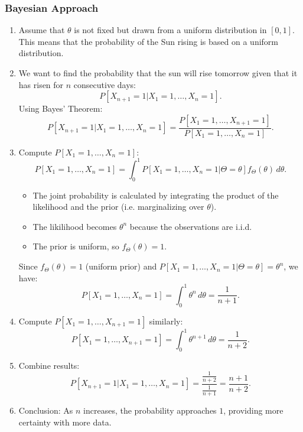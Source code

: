 \subsubsection{Bayesian Approach}
\begin{example}
    \begin{enumerate}
        \item Assume that $\theta$ is not fixed but drawn from a uniform distribution in $[0, 1]$. This means that the probability of the Sun rising is based on a uniform distribution.
        \item We want to find the probability that the sun will rise tomorrow given that it has risen for $n$ consecutive days:
        \[
        P[X_{n+1} = 1 | X_1 = 1, \dots, X_n = 1].
        \]
        Using Bayes' Theorem:
        \[
        P[X_{n+1} = 1 | X_1 = 1, \dots, X_n = 1] = \frac{P[X_1 = 1, \dots, X_{n+1} = 1]}{P[X_1 = 1, \dots, X_n = 1]}.
        \]
        \item Compute $P[X_1 = 1, \dots, X_n = 1]$:
        \[
        P[X_1 = 1, \dots, X_n = 1] = \int_0^1 P[X_1 = 1, \dots, X_n = 1 | \Theta = \theta] f_\Theta(\theta) \, d\theta.
        \]
        \begin{itemize}
            \item The joint probability is calculated by integrating the product of the likelihood and the prior (i.e. marginalizing over $\theta$).
            \item The likilihood becomes $\theta^n$ because the observations are i.i.d.
            \item The prior is uniform, so $f_\Theta(\theta) = 1$.
        \end{itemize}
        Since $f_\Theta(\theta) = 1$ (uniform prior) and $P[X_1 = 1, \dots, X_n = 1 | \Theta = \theta] = \theta^n$, we have:
        \[
        P[X_1 = 1, \dots, X_n = 1] = \int_0^1 \theta^n \, d\theta = \frac{1}{n+1}.
        \]
        \item Compute $P[X_1 = 1, \dots, X_{n+1} = 1]$ similarly:
        \[
        P[X_1 = 1, \dots, X_{n+1} = 1] = \int_0^1 \theta^{n+1} \, d\theta = \frac{1}{n+2}.
        \]
        \item Combine results:
        \[
        P[X_{n+1} = 1 | X_1 = 1, \dots, X_n = 1] = \frac{\frac{1}{n+2}}{\frac{1}{n+1}} = \frac{n+1}{n+2}.
        \]
        \item Conclusion: As $n$ increases, the probability approaches $1$, providing more certainty with more data.
    \end{enumerate}
\end{example}

